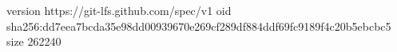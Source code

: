 version https://git-lfs.github.com/spec/v1
oid sha256:dd7eea7bcda35e98dd00939670e269cf289df884ddf69fc9189f4c20b5ebcbc5
size 262240

